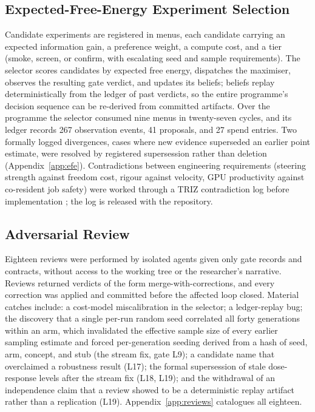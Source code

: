 \subsection{Expected-Free-Energy Experiment Selection}

Candidate experiments are registered in menus, each candidate carrying an expected information gain, a preference weight, a compute cost, and a tier (smoke, screen, or confirm, with escalating seed and sample requirements). The selector scores candidates by expected free energy, dispatches the maximiser, observes the resulting gate verdict, and updates its beliefs; beliefs replay deterministically from the ledger of past verdicts, so the entire programme's decision sequence can be re-derived from committed artifacts. Over the programme the selector consumed nine menus in twenty-seven cycles, and its ledger records 267 observation events, 41 proposals, and 27 spend entries. Two formally logged divergences, cases where new evidence superseded an earlier point estimate, were resolved by registered supersession rather than deletion (Appendix~\ref{app:efe}). Contradictions between engineering requirements (steering strength against freedom cost, rigour against velocity, GPU productivity against co-resident job safety) were worked through a TRIZ contradiction log before implementation \cite{Altshuller1984}; the log is released with the repository.

\subsection{Adversarial Review}

Eighteen reviews were performed by isolated agents given only gate records and contracts, without access to the working tree or the researcher's narrative. Reviews returned verdicts of the form merge-with-corrections, and every correction was applied and committed before the affected loop closed. Material catches include: a cost-model miscalibration in the selector; a ledger-replay bug; the discovery that a single per-run random seed correlated all forty generations within an arm, which invalidated the effective sample size of every earlier sampling estimate and forced per-generation seeding derived from a hash of seed, arm, concept, and stub (the stream fix, gate L9); a candidate name that overclaimed a robustness result (L17); the formal supersession of stale dose-response levels after the stream fix (L18, L19); and the withdrawal of an independence claim that a review showed to be a deterministic replay artifact rather than a replication (L19). Appendix~\ref{app:reviews} catalogues all eighteen.

